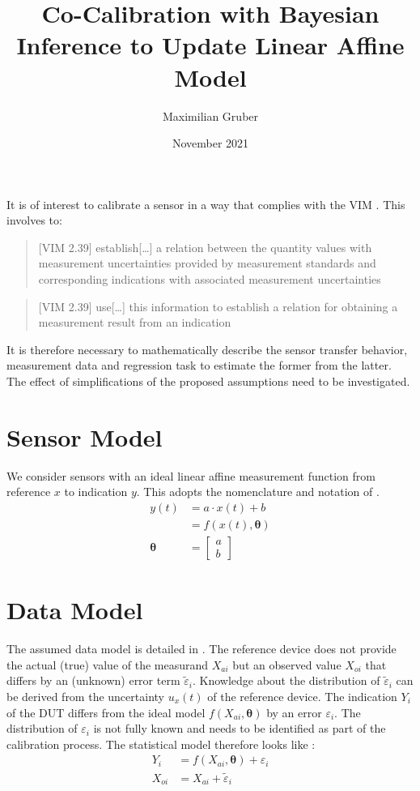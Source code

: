 \documentclass[10pt]{article}
\title{Co-Calibration with Bayesian Inference to Update Linear Affine Model}
\author{Maximilian Gruber}    %
\date{November 2021}
\renewcommand{\vec}[1]{\boldsymbol{#1}}
\begin{document}
\maketitle

It is of interest to calibrate a sensor in a way that complies with the VIM \cite{bipm_2012}. 
This involves to:

\begin{quote}[VIM 2.39]
    establish[\dots] a relation between the quantity values with measurement uncertainties provided by measurement standards and corresponding indications with associated measurement uncertainties
\end{quote}

\begin{quote}[VIM 2.39]
    use[\dots] this information to establish a relation for obtaining a measurement result from an indication
\end{quote}

It is therefore necessary to mathematically describe the sensor transfer behavior, measurement data and regression task to estimate the former from the latter.
The effect of simplifications of the proposed assumptions need to be investigated.


\section{Sensor Model}
We consider sensors with an ideal linear affine measurement function from reference $x$ to indication $y$.
This adopts the nomenclature and notation of \cite{bipm_2008,bipm_2012}.
\begin{align}
    y(t) &= a \cdot x(t) + b \nonumber \\
       &= f(x(t), \vec{\theta}) \\
    \vec{\theta} &= \begin{bmatrix} a \\ b \end{bmatrix}
\end{align}


\section{Data Model}
The assumed data model is detailed in \cite{dellaportas_1995}.
The reference device does not provide the actual (true) value of the measurand $X_{ai}$ but an observed value $X_{oi}$ that differs by an (unknown) error term $\tilde{\varepsilon}_i$.
Knowledge about the distribution of $\tilde{\varepsilon}_i$ can be derived from the uncertainty $u_x(t)$ of the reference device.
The indication $Y_i$ of the DUT differs from the ideal model $f(X_{ai}, \vec{\theta})$ by an error $\varepsilon_i$.
The distribution of $\varepsilon_i$ is not fully known and needs to be identified as part of the calibration process.
The statistical model therefore looks like \cite{dellaportas_1995}:
\begin{align}
    Y_i &= f(X_{ai}, \vec{\theta}) + \varepsilon_i \\
    X_{oi} &= X_{ai} + \tilde{\varepsilon}_i
\end{align}
\end{document}
